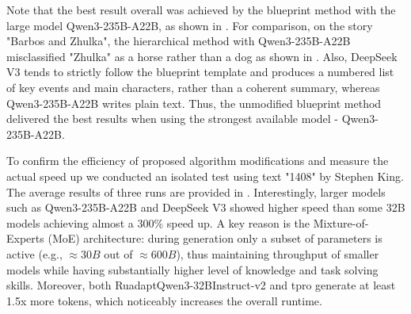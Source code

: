\documentclass{superfri}
\begin{document}
Note that the best result overall was achieved by the blueprint method with the large model Qwen3-235B-A22B,
as shown in . For comparison, on the story "Barbos and Zhulka",
the hierarchical method with Qwen3-235B-A22B misclassified "Zhulka" as a horse rather than a dog as shown in . 
Also, DeepSeek V3 tends to strictly follow the blueprint template and produces a numbered list
of key events and main characters, rather than a coherent summary, whereas Qwen3-235B-A22B writes plain text.
Thus, the unmodified blueprint method delivered the best results when using the strongest available model - Qwen3-235B-A22B.

To confirm the efficiency of proposed algorithm modifications and measure the actual speed up we conducted an isolated test using text "1408" by Stephen King. 
The average results of three runs are provided in . 
Interestingly, larger models such as Qwen3-235B-A22B and DeepSeek V3 showed higher speed
than some 32B models achieving almost a 300\% speed up.
A key reason is the Mixture-of-Experts (MoE) architecture:
during generation only a subset of parameters is active (e.g., $\approx30B$ out of $\approx600B$),
thus maintaining throughput of smaller models while having substantially higher level of knowledge and task solving skills.
Moreover, both RuadaptQwen3-32BInstruct-v2 and tpro generate at least 1.5x more tokens, which noticeably increases the overall runtime.

\end{document}
